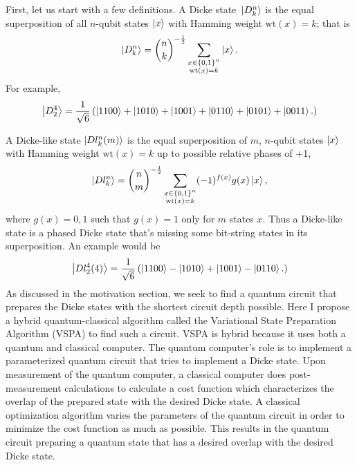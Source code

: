 \documentclass[Dual]{msu-thesis}
\begin{document}
First, let us start with a few definitions. A Dicke state $\ket*{D^n_k}$ is the equal superposition of all $n$-qubit states $\ket{x}$ with Hamming weight $\text{wt}(x)=k$; that is
\begin{align}
\ket{D_k^n}={n \choose k}^{-\frac{1}{2}}
\sum_{\substack{x\in\{0,1\}^n\\ \textrm{wt}(x)=k}}\ket{x}.
\end{align}
For example,
\begin{align}
\ket{D^4_2}=\frac{1}{\sqrt{6}}
\left(
\ket{1100}+\ket{1010}+\ket{1001}+\ket{0110}+\ket{0101}+\ket{0011}.
\right)
\end{align}

A Dicke-like state $\ket{Dl^n_k(m)}$ is the equal superposition of $m$, $n$-qubit states $\ket{x}$ with Hamming weight $\text{wt}(x)=k$ up to possible relative phases of +1,
\begin{align}
\ket{Dl_k^n}={n \choose m}^{-\frac{1}{2}}
\sum_{\substack{x\in\{0,1\}^n\\ \textrm{wt}(x)=k}}(-1)^{f(x)}g(x)\ket{x}
,\end{align}
where $g(x)=0,1$ such that $g(x)=1$ only for $m$ states $x$. Thus a Dicke-like state is a phased Dicke state that's missing some bit-string states in its superposition. An example would be
\begin{align}
\ket{Dl^4_2(4)}=\frac{1}{\sqrt{6}}
\left(
\ket{1100}-\ket{1010}+\ket{1001}-\ket{0110}.
\right)
\end{align}
As discussed in the motivation section, we seek to find a quantum circuit that prepares the Dicke states with the shortest circuit depth possible. Here I propose a hybrid quantum-classical algorithm called the Variational State Preparation Algorithm (VSPA) to find such a circuit. VSPA is hybrid because it uses both a quantum and classical computer. The quantum computer's role is to implement a parameterized quantum circuit that tries to implement a Dicke state. Upon measurement of the quantum computer, a classical computer does post-measurement calculations to calculate a cost function which characterizes the overlap of the prepared state with the desired Dicke state. A classical optimization algorithm varies the parameters of the quantum circuit in order to minimize the cost function as much as possible. This results in the quantum circuit preparing a quantum state that has a desired overlap with the desired Dicke state. 
\end{document}
